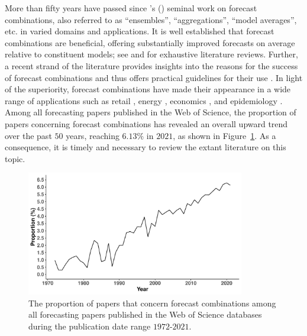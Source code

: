 \documentclass[11pt]{article}
\def\citeapos#1{\citeauthor{#1}'s (\citeyear{#1})}
\begin{document}
More than fifty years have passed since \citeapos{Bates1969-yj} seminal work on forecast combinations, also referred to as ``ensembles'', ``aggregations'', ``model averages'', etc. in varied domains and applications. It is well established that forecast combinations are beneficial, offering substantially improved forecasts on average relative to constituent models; see \citet{Clemen1989-fb} and \citet{Timmermann2006-en} for exhaustive literature reviews. Further, a recent strand of the literature provides insights into the reasons for the success of forecast combinations and thus offers practical guidelines for their use \citep{Palm1992-im,De_Menezes2000-vd,Chan2018-jl,Atiya2020-ge,Lichtendahl2020-ut}. In light of the superiority, forecast combinations have made their appearance in a wide range of applications such as retail \citep{Ma2021-np}, energy \citep{Xie2016-fb}, economics \citep{Aastveit2018-lf}, and epidemiology \citep{Brooks2020-sg}. Among all forecasting papers published in the Web of Science, the proportion of papers concerning forecast combinations has revealed an overall upward trend over the past $50$ years, reaching $6.13\%$ in $2021$, as shown in Figure~\ref{fig:prop}. As a consequence, it is timely and necessary to review the extant literature on this topic.

\begin{figure}
  \centering \includegraphics[width=0.85\textwidth]{prop}
  \caption{The proportion of papers that concern forecast combinations among all forecasting papers published in the Web of Science databases during the publication date range $1972$-$2021$.}
  \label{fig:prop}
\end{figure}
\end{document}
